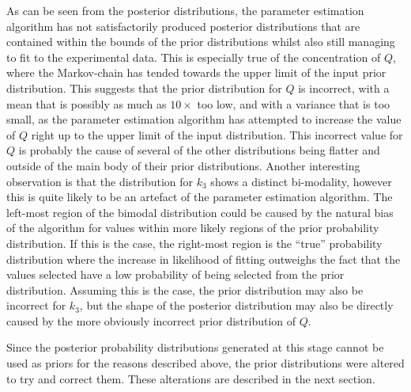 As can be seen from the posterior distributions, the parameter estimation algorithm has not satisfactorily produced posterior distributions that are contained within the bounds of the prior distributions whilst also still managing to fit to the experimental data. This is especially true of the concentration of $Q$, where the Markov-chain has tended towards the upper limit of the input prior distribution. This suggests that the prior distribution for $Q$ is incorrect, with a mean that is possibly as much as $10\times$ too low, and with a variance that is too small, as the parameter estimation algorithm has attempted to increase the value of $Q$ right up to the upper limit of the input distribution. This incorrect value for $Q$ is probably the cause of several of the other distributions being flatter and outside of the main body of their prior distributions. Another interesting observation is that the distribution for $k_3$ shows a distinct bi-modality, however this is quite likely to be an artefact of the parameter estimation algorithm. The left-most region of the bimodal distribution could be caused by the natural bias of the algorithm for values within more likely regions of the prior probability distribution. If this is the case, the right-most region is the ``true'' probability distribution where the increase in likelihood of fitting outweighs the fact that the values selected have a low probability of being selected from the prior distribution. Assuming this is the case, the prior distribution may also be incorrect for $k_3$, but the shape of the posterior distribution may also be directly caused by the more obviously incorrect prior distribution of $Q$.

Since the posterior probability distributions generated at this stage cannot be used as priors for the reasons described above, the prior distributions were altered to try and correct them. These alterations are described in the next section.


